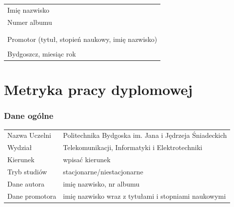 \vfill
\begin{tabular}{l}
\Large Imię nazwisko\\
Numer albumu\\
\\
\\
Promotor (tytuł, stopień naukowy, imię nazwisko)\\
\\
    Bydgoszcz, miesiąc rok\\ %
\end{tabular}

\cleardoublepage





\pagestyle{plain}
\scriptsize

\section*{Metryka pracy dyplomowej}
\subsubsection*{Dane ogólne}
\begin{tabular}{p{3cm}p{12cm}}
Nazwa Uczelni & Politechnika Bydgoska im. Jana i Jędrzeja Śniadeckich\\
Wydział & Telekomunikacji, Informatyki i Elektrotechniki \\
Kierunek & wpisać kierunek\\
Tryb studiów & stacjonarne/niestacjonarne\\
Dane autora & imię nazwisko, nr albumu\\
Dane promotora & imię nazwisko wraz z tytułami i stopniami naukowymi\\
\end{tabular}

